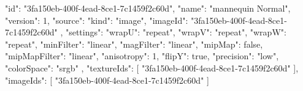 {
  "id": "3fa150eb-400f-4ead-8ce1-7c1459f2c60d",
  "name": "mannequin Normal",
  "version": 1,
  "source": {
    "kind": "image",
    "imageId": "3fa150eb-400f-4ead-8ce1-7c1459f2c60d"
  },
  "settings": {
    "wrapU": "repeat",
    "wrapV": "repeat",
    "wrapW": "repeat",
    "minFilter": "linear",
    "magFilter": "linear",
    "mipMap": false,
    "mipMapFilter": "linear",
    "anisotropy": 1,
    "flipY": true,
    "precision": "low",
    "colorSpace": "srgb"
  },
  "textureIds": [
    "3fa150eb-400f-4ead-8ce1-7c1459f2c60d"
  ],
  "imageIds": [
    "3fa150eb-400f-4ead-8ce1-7c1459f2c60d"
  ]
}
